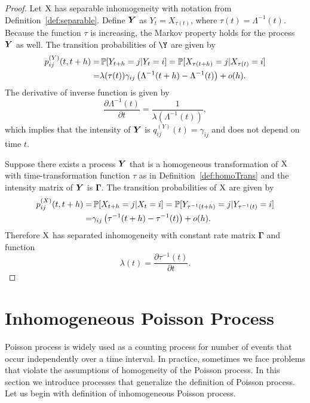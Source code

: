 {\begin{proof}
	Let $\operatorname{\bm{X}}$ has separable inhomogeneity with notation from Definition~\ref{def:separable}. Define $\bm{Y}$ as $Y_t = X_{\tau(t)}$, where $\tau(t) = \Lambda^{-1} (t)$. Because the function $\tau$ is increasing, the Markov property holds for the process $\bm{Y}$ as well. The transition probabilities of $\Y$ are given by
	\begin{align*}
		p_{ij}^{(Y)} (t, t+h)
		=& \operatorname{\mathbb{P}} [ Y_{t+h} = j \vert Y_t = i ]
		= \operatorname{\mathbb{P}} [ X_{\tau (t+h)} = j \vert X_{\tau (t)} = i ] \\
		=& \lambda(\tau (t)) \gamma_{ij} \left( \Lambda^{-1} (t+h) - \Lambda^{-1} (t) \right) + o(h).
	\end{align*}
	The derivative of inverse function is given by
	\[
		\frac{\partial \Lambda^{-1} (t)}{\partial t} = \frac{1}{\lambda (\Lambda^{-1} (t))},
	\]
	which implies that the intensity of $\bm{Y}$ is $q_{ij}^{(Y)} (t) = \gamma_{ij}$ and does not depend on time $t$.
	
	Suppose there exists a process $\bm{Y}$ that is a homogeneous transformation of $\operatorname{\bm{X}}$ with time-transformation function $\tau$ as in Definition~\ref{def:homoTrans} and the intensity matrix of $\bm{Y}$ is $\bm{\Gamma}$. The transition probabilities of $\operatorname{\bm{X}}$ are given by
		\begin{align*}
		p_{ij}^{(X)} (t, t+h)
		=& \operatorname{\mathbb{P}} [ X_{t+h} = j \vert X_t = i ]
		= \operatorname{\mathbb{P}} [ Y_{\tau^{-1} (t+h)} = j \vert Y_{\tau^{-1} (t)} = i ] \\
		=& \gamma_{ij} \left( \tau^{-1} (t+h) - \tau^{-1} (t) \right) + o(h).
	\end{align*}
	Therefore $\operatorname{\bm{X}}$ has separated inhomogeneity with constant rate matrix $\bm{\Gamma}$ and function
	\[
		\lambda(t) = \frac{\partial \tau^{-1} (t)}{\partial t}.
	\]

\end{proof}

	
	




\section{Inhomogeneous Poisson Process}
\label{chap:poisson}

Poisson process is widely used as a counting process for number of events that occur independently over a time interval. In practice, sometimes we face problems that violate the assumptions of homogeneity of the Poisson process. In this section we introduce processes that generalize the definition of Poisson process. Let us begin with definition of inhomogeneous Poisson process.

}
